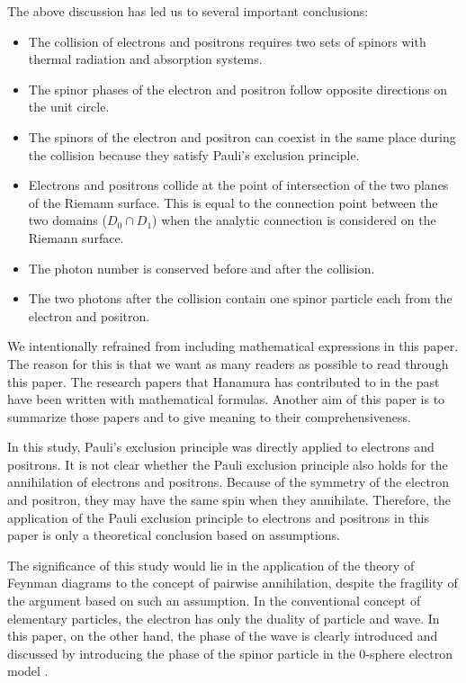 \documentclass[%
 reprint,
 amsmath,amssymb,
 aps,
]{revtex4-1}
\numberwithin{equation}{section}%
\begin{document}
The above discussion has led us to several important conclusions:

    \begin{itemize}
        \item The collision of electrons and positrons requires two sets of spinors with thermal radiation and absorption systems.
        \item The spinor phases of the electron and positron follow opposite directions on the unit circle.
        \item The spinors of the electron and positron can coexist in the same place during the collision because they satisfy Pauli's exclusion principle.
        \item Electrons and positrons collide at the point of intersection of the two planes of the Riemann surface. This is equal to the connection point between the two domains ($D_{0} \cap D_{1}$) when the analytic connection is considered on the Riemann surface.
        \item The photon number is conserved before and after the collision.
        \item The two photons after the collision contain one spinor particle each from the electron and positron.
    \end{itemize}


We intentionally refrained from including mathematical expressions in this paper. The reason for this is that we want as many readers as possible to read through this paper. The research papers that Hanamura has contributed to in the past have been written with mathematical formulas. Another aim of this paper is to summarize those papers and to give meaning to their comprehensiveness.


In this study, Pauli's exclusion principle was directly applied to electrons and positrons. It is not clear whether the Pauli exclusion principle also holds for the annihilation of electrons and positrons. Because of the symmetry of the electron and positron, they may have the same spin when they annihilate. Therefore, the application of the Pauli exclusion principle to electrons and positrons in this paper is only a theoretical conclusion based on assumptions.


The significance of this study would lie in the application of the theory of Feynman diagrams to the concept of pairwise annihilation, despite the fragility of the argument based on such an assumption. In the conventional concept of elementary particles, the electron has only the duality of particle and wave. In this paper, on the other hand, the phase of the wave is clearly introduced and discussed by introducing the phase of the spinor particle in the 0-sphere electron model \cite{Hanamura1} \cite{Hanamura2}.
\end{document}
